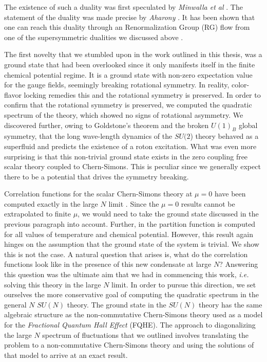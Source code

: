 The existence of such a duality was first speculated by \textit{Minwalla et al} \cite{Giombi:2011kc}. The statement of the duality was made precise by \textit{Aharony} \cite{Aharony:2015mjs}.  It has been shown that one can reach this duality through an Renormalization Group (RG) flow from one of the supersymmetric dualities we discussed above \cite{Gur-Ari:2015pca}.


The first novelty that we stumbled upon in the work outlined in this thesis, was a ground state that had been overlooked since it only manifests itself in the finite chemical potential regime. It is a ground state with non-zero expectation value for the gauge fields, seemingly breaking rotational symmetry. In reality, color-flavor locking remedies this and the rotational symmetry is preserved. In order to confirm that the rotational symmetry is preserved, we computed the quadratic spectrum of the theory, which showed no signs of rotational asymmetry. We discovered further, owing to Goldstone's theorem and the broken $U(1)_B$ global symmetry, that the long wave-length dynamics of the $SU(2$) theory behaved as a superfluid and predicts the existence of a roton excitation. What was even more surprising is that this non-trivial ground state exists in the zero coupling free scalar theory coupled to Chern-Simons. This is peculiar since we generally expect there to be a potential that drives the symmetry breaking.

Correlation functions for the scalar Chern-Simons theory at $\mu=0$ have been computed exactly in the large $N$ limit \cite{Aharony:2012nh}. Since the $\mu =0$ results cannot be extrapolated to finite $\mu$, we would need to take the ground state discussed in the previous paragraph into account. Further, in \cite{Jain:2013gza} the partition function is computed for all values of temperature and chemical potential. However, this result again hinges on the assumption that the ground state of the system is trivial. We show this is not the case. A natural question that arises is, what do the correlation functions look like in the presence of this new condensate at large $N$? Answering this question was the ultimate aim that we had in commencing this work, \textit{i.e.} solving this theory in the large $N$ limit. In order to pursue this direction, we set ourselves the more conservative goal of computing the quadratic spectrum in the general $N$ $SU(N)$ theory. The ground state in the $SU(N)$ theory has the same algebraic structure as the non-commutative Chern-Simons theory used as a model for the \textit{Fractional Quantum Hall Effect} (FQHE). The approach to diagonalizing the large $N$ spectrum of fluctuations that we outlined involves translating the problem to a non-commutative Chern-Simons theory and using the solutions of that model to arrive at an exact result.

